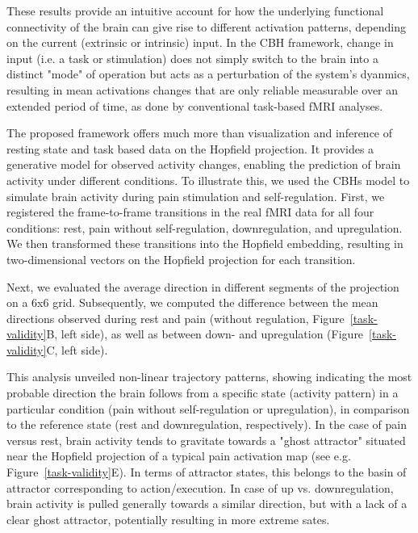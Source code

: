 \documentclass{article}
\begin{document}
These results provide an intuitive account for how the underlying functional connectivity of the brain can give rise to different activation patterns, depending on the current (extrinsic or intrinsic) input.
In the CBH framework, change in input (i.e. a task or stimulation) does not simply switch to the brain into a distinct "mode" of operation but acts as a perturbation of the system's dyanmics, resulting in mean activations changes that are only reliable measurable over an extended period of time, as done by conventional task-based fMRI analyses.

The proposed framework offers much more than visualization and inference of resting state and task based data on the Hopfield projection.
It provides a generative model for observed activity changes, enabling the prediction of brain activity under different conditions.
To illustrate this, we used the CBHs model to simulate brain activity during pain stimulation and self-regulation.
First, we registered the frame-to-frame transitions in the real fMRI data for all four conditions: rest, pain without self-regulation, downregulation, and upregulation. We then transformed these transitions into the Hopfield embedding, resulting in two-dimensional vectors on the Hopfield projection for each transition.

Next, we evaluated the average direction in different segments of the projection on a 6x6 grid. Subsequently, we computed the difference between the mean directions observed during rest and pain (without regulation, Figure~\ref{task-validity}B, left side), as well as between down- and upregulation (Figure~\ref{task-validity}C, left side).

This analysis unveiled non-linear trajectory patterns, showing indicating the most probable direction the brain follows from a specific state (activity pattern) in a particular condition (pain without self-regulation or upregulation), in comparison to the reference state (rest and downregulation, respectively).
In the case of pain versus rest, brain activity tends to gravitate towards a "ghost attractor" situated near the Hopfield projection of a typical pain activation map (see e.g. Figure~\ref{task-validity}E). In terms of attractor states, this belongs to the basin of attractor corresponding to action/execution. In case of up vs. downregulation, brain activity is pulled generally towards a similar direction, but with a lack of a clear ghost attractor, potentially resulting in more extreme sates.
\end{document}
